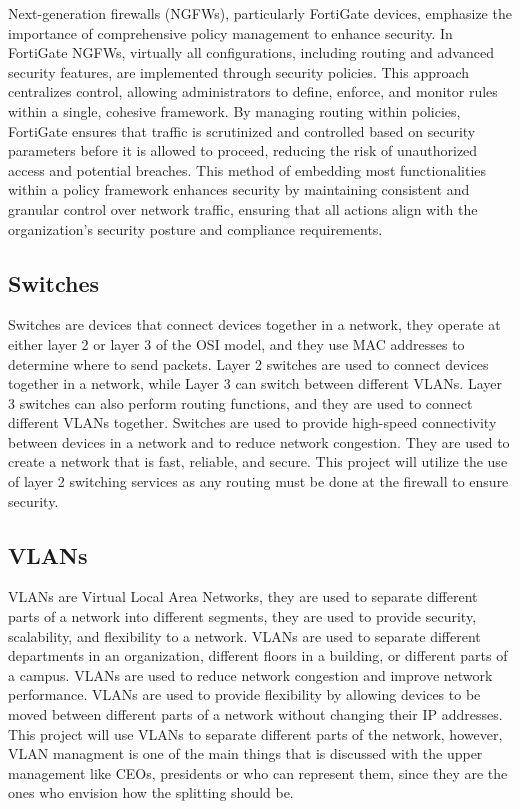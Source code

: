 \documentclass[12pt]{report}
\begin{document}
Next-generation firewalls (NGFWs), particularly FortiGate devices, emphasize the importance of comprehensive policy management to enhance security. In FortiGate NGFWs, virtually all configurations, including routing and advanced security features, are implemented through security policies. This approach centralizes control, allowing administrators to define, enforce, and monitor rules within a single, cohesive framework. By managing routing within policies, FortiGate ensures that traffic is scrutinized and controlled based on security parameters before it is allowed to proceed, reducing the risk of unauthorized access and potential breaches. This method of embedding most functionalities within a policy framework enhances security by maintaining consistent and granular control over network traffic, ensuring that all actions align with the organization's security posture and compliance requirements.%
\subsection{Switches}
Switches are devices that connect devices together in a network, they operate at either layer 2 or layer 3 of the OSI model, and they use MAC addresses to determine where to send packets. Layer 2 switches are used to connect devices together in a network, while Layer 3 can switch between different VLANs. Layer 3 switches can also perform routing functions, and they are used to connect different VLANs together. Switches are used to provide high-speed connectivity between devices in a network and to reduce network congestion. They are used to create a network that is fast, reliable, and secure. This project will utilize the use of layer 2 switching services as any routing must be done at the firewall to ensure security. %
\subsection{VLANs}
VLANs are Virtual Local Area Networks, they are used to separate different parts of a network into different segments, they are used to provide security, scalability, and flexibility to a network. VLANs are used to separate different departments in an organization, different floors in a building, or different parts of a campus. VLANs are used to reduce network congestion and improve network performance. VLANs are used to provide flexibility by allowing devices to be moved between different parts of a network without changing their IP addresses. This project will use VLANs to separate different parts of the network, however, VLAN managment is one of the main things that is discussed with the upper management like CEOs, presidents or who can represent them, since they are the ones who envision how the splitting should be. %
\end{document}
